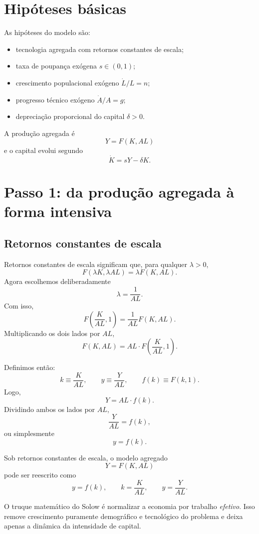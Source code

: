 \documentclass[11pt,a4paper]{article}
\begin{document}
\section{Hip\'oteses b\'asicas}

As hip\'oteses do modelo s\~ao:
\begin{itemize}
  \item tecnologia agregada com retornos constantes de escala;
  \item taxa de poupan\c{c}a ex\'ogena \(s\in(0,1)\);
  \item crescimento populacional ex\'ogeno \(\dot L/L=n\);
  \item progresso t\'ecnico ex\'ogeno \(\dot A/A=g\);
  \item deprecia\c{c}\~ao proporcional do capital \(\delta>0\).
\end{itemize}

A produ\c{c}\~ao agregada \'e
\[
Y=F(K,AL)
\]
e o capital evolui segundo
\[
\dot K=sY-\delta K.
\]

\section{Passo 1: da produ\c{c}\~ao agregada \`a forma intensiva}

\subsection{Retornos constantes de escala}

Retornos constantes de escala significam que, para qualquer \(\lambda>0\),
\[
F(\lambda K,\lambda AL)=\lambda F(K,AL).
\]
Agora escolhemos deliberadamente
\[
\lambda=\frac{1}{AL}.
\]
Com isso,
\[
F\!\left(\frac{K}{AL},1\right)=\frac{1}{AL}F(K,AL).
\]
Multiplicando os dois lados por \(AL\),
\[
F(K,AL)=AL\cdot F\!\left(\frac{K}{AL},1\right).
\]

Definimos ent\~ao:
\[
k\equiv \frac{K}{AL},
\qquad
y\equiv \frac{Y}{AL},
\qquad
f(k)\equiv F(k,1).
\]
Logo,
\[
Y=AL\cdot f(k).
\]
Dividindo ambos os lados por \(AL\),
\[
\frac{Y}{AL}=f(k),
\]
ou simplesmente
\[
y=f(k).
\]

\begin{resultado}
Sob retornos constantes de escala, o modelo agregado
\[
Y=F(K,AL)
\]
pode ser reescrito como
\[
y=f(k),
\qquad
k=\frac{K}{AL},
\qquad
y=\frac{Y}{AL}.
\]
\end{resultado}

\begin{intuicao}
O truque matem\'atico do Solow \'e normalizar a economia por trabalho
\emph{efetivo}. Isso remove crescimento puramente demogr\'afico e tecnol\'ogico
do problema e deixa apenas a din\^amica da intensidade de capital.
\end{intuicao}
\end{document}
